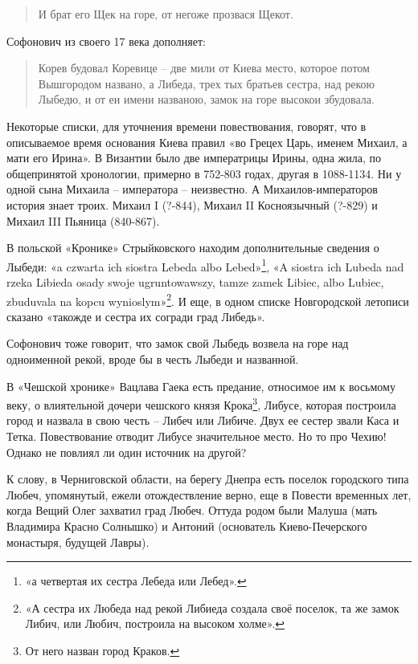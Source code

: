 \begin{quotation}
И брат его Щек на горе, от негоже прозвася Щекот.
\end{quotation}

Софонович из своего 17 века дополняет:

\begin{quotation}
Корев будовал Коревице – две мили от Киева место, которое потом Вышгородом названо, а Либеда, трех тых братьев сестра, над рекою Лыбедю, и от еи имени названою, замок на горе высокои збудовала.
\end{quotation}

Некоторые списки, для уточнения времени повествования, говорят, что в описываемое время основания Киева правил «во Грецех Царь, именем Михаил, а мати его Ирина». В Византии было две императрицы Ирины, одна жила, по общепринятой хронологии, примерно в 752-803 годах, другая в 1088-1134. Ни у одной сына Михаила – императора – неизвестно. А Михаилов-императоров история знает троих. Михаил I (?-844), Михаил II Косноязычный (?-829) и Михаил III Пьяница (840-867).

В польской «Кронике» Стрыйковского\cite{strykron} находим дополнительные сведения о Лыбеди: «a czwarta ich siostra Lebeda albo Lebed»\footnote{«а четвертая их сестра Лебеда или Лебед».}, «A siostra ich Lubeda nad rzeka Libieda osady swoje ugruntowawszy, tamze zamek Libiec, albo Lubiec, zbuduvala na kopcu wynioslym»\footnote{«А сестра их Любеда над рекой Либиеда создала своё поселок, та же замок Либич, или Любич, построила на высоком холме».}. И еще, в одном списке Новгородской летописи сказано «такожде и сестра их согради град Либедь».

Софонович тоже говорит, что замок свой Лыбедь возвела на горе над одноименной рекой, вроде бы в честь Лыбеди и названной.

В «Чешской хронике» Вацлава Гаека есть предание, относимое им к восьмому веку, о влиятельной дочери чешского князя Крока\footnote{От него назван город Краков.}, Либусе, которая построила город и назвала в свою честь – Либеч или Либиче. Двух ее сестер звали Каса и Тетка. Повествование отводит Либусе значительное место. Но то про Чехию! Однако не повлиял ли один источник на другой?

К слову, в Черниговской области, на берегу Днепра есть поселок городского типа Любеч, упомянутый, ежели отождествление верно, еще в Повести временных лет, когда Вещий Олег захватил град Любеч. Оттуда родом были Малуша (мать Владимира Красно Солнышко) и Антоний (основатель Киево-Печерского монастыря, будущей Лавры). 

